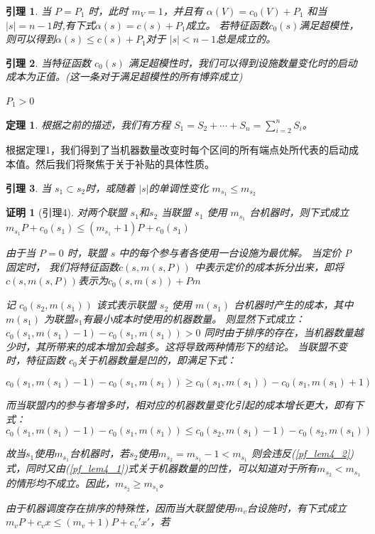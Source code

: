 \documentclass[UTF8]{article}
\newtheorem{thm}{\hspace{2em}定理}
\newtheorem{lem}{\hspace{2em}引理}
\newtheorem{pf}{\hspace{2em}证明}
\begin{document}
\begin{lem}\label{lem3}
当 $P=P_1$ 时，此时 $m_V=1$，并且有 $\alpha(V)=c_0(V)+P_1$ 和当 $\left| s \right|= n-1$时,有下式$\alpha(s)=c(s)+P_1$成立。
若特征函数$c_0(s)$满足超模性，则可以得到$\alpha(s) \leq c(s)+P_1$对于 $\left| s \right| < n-1 $总是成立的。
\end{lem}


\begin{lem}\label{lem4}
当特征函数 $c_0(s)$ 满足超模性时，我们可以得到设施数量变化时的启动成本为正值。(这一条对于满足超模性的所有博弈成立)

$P_1 > 0$

\end{lem}


\begin{thm}\label{thm1}
根据之前的描述，我们有方程
$S_{1}=S_{2}+\cdots+S_{n}=\sum_{i=2}^n S_i$。\\

\end{thm}

根据定理1，我们得到了当机器数量改变时每个区间的所有端点处所代表的启动成本值。然后我们将聚焦于关于补贴的具体性质。

\begin{lem}\label{lem5}
当 $s_1 \subset s_2$时，或随着 $\left|s\right|$的单调性变化
$m_{s_1} \leq m_{s_2}$
\end{lem}


\begin{pf}[引理4]
对两个联盟 $s_1$和$s_2$
当联盟 $s_1$ 使用 $m_{s_1}$ 台机器时，则下式成立
$m_{s_1}P+c_0(s_1) \leq (m_{s_1}+1)P+c_0(s_1)$


由于当 $P=0$ 时，联盟 $s$ 中的每个参与者各使用一台设施为最优解。
当定价 P 固定时，
我们将特征函数$c(s,m(s,P))$ 中表示定价的成本拆分出来，即将$c(s,m(s,P))$表示为$c_0(s,m(s))+Pm$

记 $c_0(s_2,m(s_1))$ 该式表示联盟 $s_2$ 使用 $m(s_1)$ 台机器时产生的成本，其中$m(s_1)$ 为联盟$s_1$有最小成本时使用的机器数量。
则显然下式成立：
$c_0(s_1,m(s_1)-1)-c_0(s_1,m(s_1))>0$
同时由于排序的存在，当机器数量越少时，其所带来的成本增加会越多。这将导致两种情形下的结论。
当联盟不变时，特征函数 $c_0$关于机器数量是凹的，即满足下式：

\begin{equation}\label{pf_lem4_1}
  c_0(s_1,m(s_1)-1)-c_0(s_1,m(s_1)) \geq
  c_0(s_1,m(s_1))-c_0(s_1,m(s_1)+1)
\end{equation}


而当联盟内的参与者增多时，相对应的机器数量变化引起的成本增长更大，即有下式：
\begin{equation}\label{pf_lem4_2}
  c_0(s_1,m(s_1)-1)-c_0(s_1,m(s_1)) \leq
  c_0(s_2,m(s_1)-1)-c_0(s_2,m(s_1))
\end{equation}

故当$s_1$使用$m_{s_1}$台机器时，若$s_2$使用$m_{s_2}=m_{s_1}-1 < m_{s_1}$ 则会违反(\ref{pf_lem4_2})式，同时又由(\ref{pf_lem4_1})式关于机器数量的凹性，可以知道对于所有$m_{s_2}<m_{s_1}$的情形均不成立。因此，$m_{s_2} \geq m_{s_1}$。


由于机器调度存在排序的特殊性，因而当大联盟使用$m_v$台设施时，有下式成立$m_vP+c_vx \leq (m_v+1)P+c_v'x'$，若

\end{pf}
\end{document}
